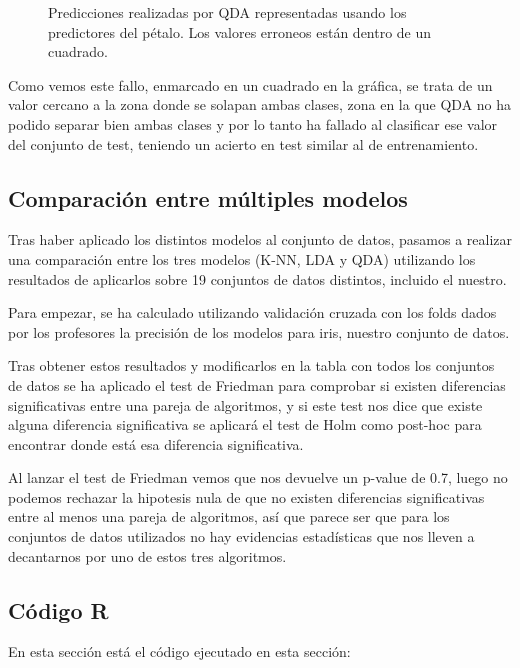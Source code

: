 \begin{figure}[H]
	\centering
	
	\caption{Predicciones realizadas por QDA representadas usando los predictores del pétalo. Los valores erroneos están dentro de un cuadrado.}
	\label{fig:predicciones_qda}
\end{figure}

Como vemos este fallo, enmarcado en un cuadrado en la gráfica, se trata de un valor cercano a la zona donde se solapan ambas clases, zona en la que QDA no ha podido separar bien ambas clases y por lo tanto ha fallado al clasificar ese valor del conjunto de test, teniendo un acierto en test similar al de entrenamiento.

\subsection{Comparación entre múltiples modelos}

Tras haber aplicado los distintos modelos al conjunto de datos, pasamos a realizar una comparación entre los tres modelos (K-NN, LDA y QDA) utilizando los resultados de aplicarlos sobre 19 conjuntos de datos distintos, incluido el nuestro.

Para empezar, se ha calculado utilizando validación cruzada con los folds dados por los profesores la precisión de los modelos para iris, nuestro conjunto de datos.

Tras obtener estos resultados y modificarlos en la tabla con todos los conjuntos de datos se ha aplicado el test de Friedman para comprobar si existen diferencias significativas entre una pareja de algoritmos, y si este test nos dice que existe alguna diferencia significativa se aplicará el test de Holm como post-hoc para encontrar donde está esa diferencia significativa.

Al lanzar el test de Friedman vemos que nos devuelve un p-value de 0.7, luego no podemos rechazar la hipotesis nula de que no existen diferencias significativas entre al menos una pareja de algoritmos, así que parece ser que para los conjuntos de datos utilizados no hay evidencias estadísticas que nos lleven a decantarnos por uno de estos tres algoritmos.

\subsection{Código R}

En esta sección está el código ejecutado en esta sección:


